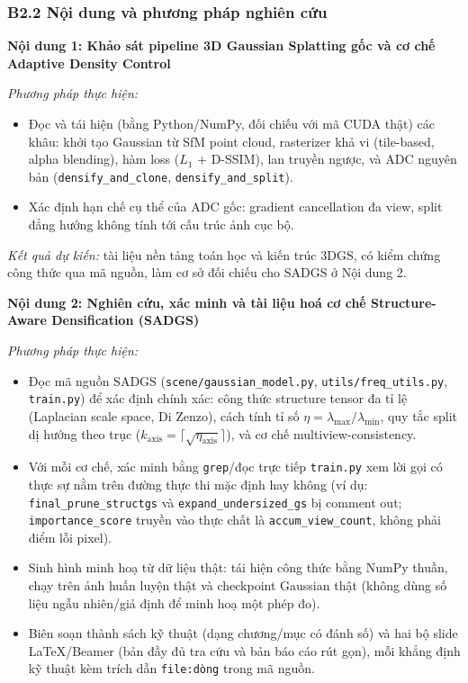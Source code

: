 \documentclass[a4paper,12pt]{article}
\begin{document}
\subsubsection*{B2.2 Nội dung và phương pháp nghiên cứu}

\textbf{Nội dung 1: Khảo sát pipeline 3D Gaussian Splatting gốc và cơ chế Adaptive Density
Control}

\textit{Phương pháp thực hiện:}
\begin{itemize}[leftmargin=1.2em]
\item Đọc và tái hiện (bằng Python/NumPy, đối chiếu với mã CUDA thật) các khâu: khởi tạo Gaussian
từ SfM point cloud, rasterizer khả vi (tile-based, alpha blending), hàm loss ($L_1$ + D-SSIM),
lan truyền ngược, và ADC nguyên bản (\texttt{densify\_and\_clone}, \texttt{densify\_and\_split}).
\item Xác định hạn chế cụ thể của ADC gốc: gradient cancellation đa view, split đẳng hướng không
tính tới cấu trúc ảnh cục bộ.
\end{itemize}

\textit{Kết quả dự kiến:} tài liệu nền tảng toán học và kiến trúc 3DGS, có kiểm chứng công thức
qua mã nguồn, làm cơ sở đối chiếu cho SADGS ở Nội dung 2.

\medskip
\textbf{Nội dung 2: Nghiên cứu, xác minh và tài liệu hoá cơ chế Structure-Aware Densification
(SADGS)}

\textit{Phương pháp thực hiện:}
\begin{itemize}[leftmargin=1.2em]
\item Đọc mã nguồn SADGS (\texttt{scene/gaussian\_model.py}, \texttt{utils/freq\_utils.py},
\texttt{train.py}) để xác định chính xác: công thức structure tensor đa tỉ lệ (Laplacian scale
space, Di Zenzo), cách tính tỉ số $\eta = \lambda_{\max}/\lambda_{\min}$, quy tắc split dị hướng
theo trục ($k_{\text{axis}} = \lceil\sqrt{\eta_{\text{axis}}}\rceil$), và cơ chế
multiview-consistency.
\item Với mỗi cơ chế, xác minh bằng \texttt{grep}/đọc trực tiếp \texttt{train.py} xem lời gọi có
thực sự nằm trên đường thực thi mặc định hay không (ví dụ: \texttt{final\_prune\_structgs} và
\texttt{expand\_undersized\_gs} bị comment out; \texttt{importance\_score} truyền vào thực chất
là \texttt{accum\_view\_count}, không phải điểm lỗi pixel).
\item Sinh hình minh hoạ từ dữ liệu thật: tái hiện công thức bằng NumPy thuần, chạy trên ảnh huấn
luyện thật và checkpoint Gaussian thật (không dùng số liệu ngẫu nhiên/giả định để minh hoạ một
phép đo).
\item Biên soạn thành sách kỹ thuật (dạng chương/mục có đánh số) và hai bộ slide LaTeX/Beamer
(bản đầy đủ tra cứu và bản báo cáo rút gọn), mỗi khẳng định kỹ thuật kèm trích dẫn
\texttt{file:dòng} trong mã nguồn.
\end{itemize}
\end{document}
